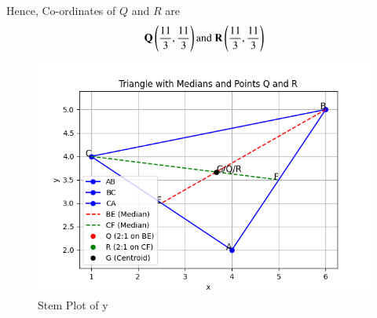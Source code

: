 \documentclass[journal]{IEEEtran}
\numberwithin{equation}{enumi}
\numberwithin{figure}{enumi}
\begin{document}
Hence, Co-ordinates of $Q$ and $R$ are\\
\begin{align*}
    \vec{Q}\brak{\frac{11}{3},\frac{11}{3}} \text{and}\ \vec{R}\brak{\frac{11}{3},\frac{11}{3}}
\end{align*}
\begin{figure}[h!]
   \centering
   \includegraphics[width=0.7\linewidth]{Figure_1.png}
   \caption{Stem Plot of y}
   \label{stemplot}
\end{figure}
\end{document}
